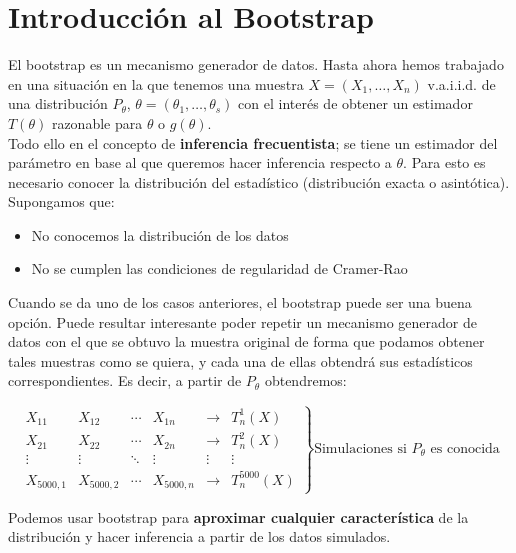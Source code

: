 \section{Introducción al Bootstrap}

El bootstrap es un mecanismo generador de datos. Hasta ahora hemos trabajado en una situación en la que tenemos una muestra $X=(X_1,\dots,X_n)$ v.a.i.i.d. de una distribución $P_\theta$, $\theta=(\theta_1,\dots,\theta_s)$ con el interés de obtener un estimador $T(\theta)$ razonable para $\theta$ o $g(\theta)$.\\

Todo ello en el concepto de \textbf{inferencia frecuentista}; se tiene un estimador del parámetro en base al que queremos hacer inferencia respecto a $\theta$.
Para esto es necesario conocer la distribución del estadístico  (distribución exacta o asintótica). Supongamos que:
\begin{itemize}
    \item No conocemos la distribución de los datos
    \item No se cumplen las condiciones de regularidad de Cramer-Rao
\end{itemize}

Cuando se da uno de los casos anteriores, el bootstrap puede ser una buena opción. Puede resultar interesante poder repetir un mecanismo generador de datos con el que se obtuvo la muestra original de forma que podamos obtener tales muestras como se quiera, y cada una de ellas obtendrá sus estadísticos correspondientes. Es decir, a partir de $P_\theta$ obtendremos:

$$\left.
    \begin{matrix}
        X_{11}     & X_{12}     & \cdots & X_{1n}     & \longrightarrow & T^{1}_n(X)    \\
        X_{21}     & X_{22}     & \cdots & X_{2n}     & \longrightarrow & T^{2}_n(X)    \\
        \vdots     & \vdots     & \ddots & \vdots     & \vdots          & \vdots        \\
        X_{5000,1} & X_{5000,2} & \cdots & X_{5000,n} & \longrightarrow & T^{5000}_n(X)
    \end{matrix}
    \right\}\text{Simulaciones si $P_\theta$ es conocida}$$

Podemos usar bootstrap para \textbf{aproximar cualquier característica} de la distribución y hacer inferencia a partir de los datos simulados.\\

